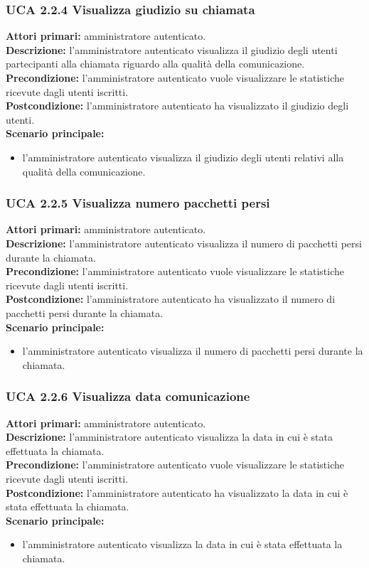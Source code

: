 \subsubsection{UCA 2.2.4 Visualizza giudizio su chiamata}
\noindent 
\textbf{Attori primari:} amministratore autenticato.\\
\textbf{Descrizione:} l'amministratore autenticato visualizza il giudizio degli utenti partecipanti alla chiamata riguardo alla qualità della comunicazione.\\
\textbf{Precondizione:} l'amministratore autenticato vuole visualizzare le statistiche ricevute dagli utenti iscritti.\\
\textbf{Postcondizione:} l'amministratore autenticato ha visualizzato il giudizio degli utenti.\\
\textbf{Scenario principale:}
\begin{itemize}
\item l'amministratore autenticato visualizza il giudizio degli utenti relativi alla qualità della comunicazione.
\end{itemize}

\subsubsection{UCA 2.2.5 Visualizza numero pacchetti persi}
\noindent 
\textbf{Attori primari:} amministratore autenticato.\\
\textbf{Descrizione:} l'amministratore autenticato visualizza il numero di pacchetti persi  durante la chiamata.\\
\textbf{Precondizione:} l'amministratore autenticato vuole visualizzare le statistiche ricevute dagli utenti iscritti.\\
\textbf{Postcondizione:} l'amministratore autenticato ha visualizzato il numero di pacchetti persi durante la chiamata.\\
\textbf{Scenario principale:}
\begin{itemize}
\item l'amministratore autenticato visualizza il numero di pacchetti persi durante la chiamata.
\end{itemize}

\subsubsection{UCA 2.2.6 Visualizza data comunicazione}
\noindent 
\textbf{Attori primari:} amministratore autenticato.\\
\textbf{Descrizione:} l'amministratore autenticato visualizza la data in cui è stata effettuata la chiamata.\\
\textbf{Precondizione:} l'amministratore autenticato vuole visualizzare le statistiche ricevute dagli utenti iscritti.\\
\textbf{Postcondizione:} l'amministratore autenticato ha visualizzato la data in cui è stata effettuata la chiamata.\\
\textbf{Scenario principale:}
\begin{itemize}
\item l'amministratore autenticato visualizza la data in cui è stata effettuata la chiamata.
\end{itemize}

